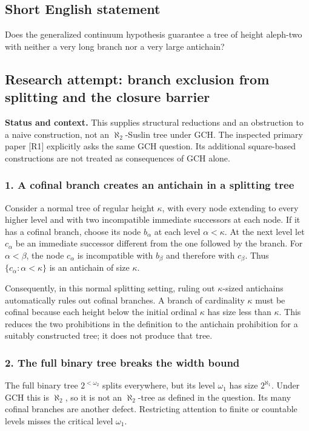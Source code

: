 \documentclass[11pt,a4paper]{article}
\begin{document}
\subsection{Short English statement}

Does the generalized continuum hypothesis guarantee a tree of height aleph-two with neither a very long branch nor a very large antichain?

\subsection{Research attempt: branch exclusion from splitting and the closure barrier}
\textbf{Status and context.} This supplies structural reductions and an obstruction to a naive construction, not an $\aleph_2$-Suslin tree under GCH. The inspected primary paper [R1] explicitly asks the same GCH question. Its additional square-based constructions are not treated as consequences of GCH alone.

\subsubsection{1. A cofinal branch creates an antichain in a splitting tree}
Consider a normal tree of regular height $\kappa$, with every node extending to every higher level and with two incompatible immediate successors at each node. If it has a cofinal branch, choose its node $b_\alpha$ at each level $\alpha<\kappa$. At the next level let $c_\alpha$ be an immediate successor different from the one followed by the branch. For $\alpha<\beta$, the node $c_\alpha$ is incompatible with $b_\beta$ and therefore with $c_\beta$. Thus $\{c_\alpha:\alpha<\kappa\}$ is an antichain of size $\kappa$.

Consequently, in this normal splitting setting, ruling out $\kappa$-sized antichains automatically rules out cofinal branches. A branch of cardinality $\kappa$ must be cofinal because each height below the initial ordinal $\kappa$ has size less than $\kappa$. This reduces the two prohibitions in the definition to the antichain prohibition for a suitably constructed tree; it does not produce that tree.

\subsubsection{2. The full binary tree breaks the width bound}
The full binary tree $2^{<\omega_2}$ splits everywhere, but its level $\omega_1$ has size $2^{\aleph_1}$. Under GCH this is $\aleph_2$, so it is not an $\aleph_2$-tree as defined in the question. Its many cofinal branches are another defect. Restricting attention to finite or countable levels misses the critical level $\omega_1$.
\end{document}
